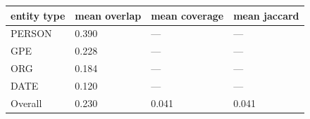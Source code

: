\begin{tabular}{llll}
\toprule
entity type & mean overlap & mean coverage & mean jaccard \\
\midrule
PERSON & 0.390 & — & — \\
GPE & 0.228 & — & — \\
ORG & 0.184 & — & — \\
DATE & 0.120 & — & — \\
Overall & 0.230 & 0.041 & 0.041 \\
\bottomrule
\end{tabular}
